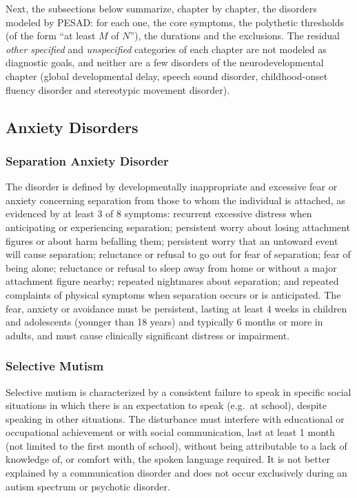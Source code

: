 Next, the subsections below summarize, chapter by chapter, the disorders
modeled by PESAD: for each one, the core symptoms, the polythetic thresholds
(of the form ``at least $M$ of $N$''), the durations and the exclusions. The
residual \emph{other specified} and \emph{unspecified} categories of each
chapter are not modeled as diagnostic goals, and neither are a few disorders
of the neurodevelopmental chapter (global developmental delay, speech sound
disorder, childhood-onset fluency disorder and stereotypic movement
disorder).

\subsection{Anxiety Disorders}

\subsubsection{Separation Anxiety Disorder}

The disorder is defined by developmentally inappropriate and excessive fear or
anxiety concerning separation from those to whom the individual is attached, as
evidenced by at least 3 of 8 symptoms: recurrent excessive distress when
anticipating or experiencing separation; persistent worry about losing
attachment figures or about harm befalling them; persistent worry that an
untoward event will cause separation; reluctance or refusal to go out for fear of
separation; fear of being alone; reluctance or refusal to sleep away from home or
without a major attachment figure nearby; repeated nightmares about separation;
and repeated complaints of physical symptoms when separation occurs or is
anticipated. The fear, anxiety or avoidance must be persistent, lasting
at least 4 weeks in children and adolescents (younger than 18 years) and
typically 6 months or more in adults, and must cause clinically
significant distress or impairment.

\subsubsection{Selective Mutism}

Selective mutism is characterized by a consistent failure to speak in specific
social situations in which there is an expectation to speak (e.g.\ at school),
despite speaking in other situations. The disturbance must interfere with
educational or occupational achievement or with social communication, last
at least 1 month (not limited to the first month of school), without being
attributable to a lack of knowledge of, or comfort with, the spoken language
required. It is not better explained by a communication disorder and does not
occur exclusively during an autism spectrum or psychotic disorder.

